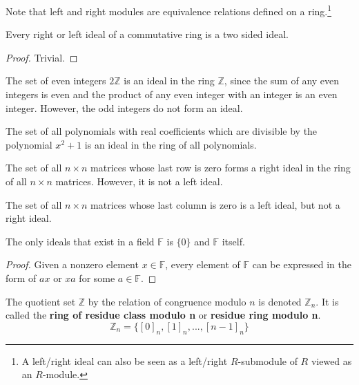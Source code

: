   Note that left and right modules are equivalence relations defined on a ring.\footnote{A left/right ideal can also be seen as a left/right $R$-submodule of $R$ viewed as an $R$-module. } 

  \begin{proposition}
    Every right or left ideal of a commutative ring is a two sided ideal. 
  \end{proposition}
  \begin{proof}
    Trivial. 
  \end{proof}

  \begin{example}
    The set of even integers $2 \mathbb{Z}$ is an ideal in the ring $\mathbb{Z}$, since the sum of any even integers is even and the product of any even integer with an integer is an even integer. However, the odd integers do not form an ideal. 
  \end{example}

  \begin{example}
    The set of all polynomials with real coefficients which are divisible by the polynomial $x^2 + 1$ is an ideal in the ring of all polynomials. 
  \end{example}

  \begin{example}
    The set of all $n \times n$ matrices whose last row is zero forms a right ideal in the ring of all $n \times n$ matrices. However, it is not a left ideal.

    The set of all $n\times n$ matrices whose last column is zero is a left ideal, but not a right ideal. 
  \end{example}

  \begin{proposition}
    The only ideals that exist in a field $\mathbb{F}$ is $\{0\}$ and $\mathbb{F}$ itself. 
  \end{proposition}
  \begin{proof}
    Given a nonzero element $x \in \mathbb{F}$, every element of $\mathbb{F}$ can be expressed in the form of $a x$ or $x a$ for some $a \in \mathbb{F}$. 
  \end{proof}
  
  \begin{definition}
    The quotient set $\mathbb{Z}$ by the relation of congruence modulo $n$ is denoted $\mathbb{Z}_{n}$. It is called the \textbf{ring of residue class modulo n} or \textbf{residue ring modulo n}. 
    \begin{equation}
      \mathbb{Z}_{n} = \{ [0]_{n}, [1]_{n}, ... , [n-1]_{n} \}
    \end{equation}
  \end{definition}

